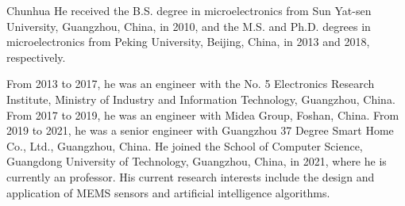 \documentclass[journal]{IEEEtran}
\begin{document}
\begin{IEEEbiographynophoto}{Chunhua He}
received the B.S. degree in microelectronics from Sun Yat-sen University, Guangzhou, China, in 2010, and the M.S. and Ph.D. degrees in microelectronics from Peking University, Beijing, China, in 2013 and 2018, respectively.

From 2013 to 2017, he was an engineer with the No. 5 Electronics Research Institute, Ministry of Industry and Information Technology, Guangzhou, China. From 2017 to 2019, he was an engineer with Midea Group, Foshan, China. From 2019 to 2021, he was a senior engineer with Guangzhou 37 Degree Smart Home Co., Ltd., Guangzhou, China. He joined the School of Computer Science, Guangdong University of Technology, Guangzhou, China, in 2021, where he is currently an professor. His current research interests include the design and application of MEMS sensors and artificial intelligence algorithms.
\end{IEEEbiographynophoto}
\end{document}
